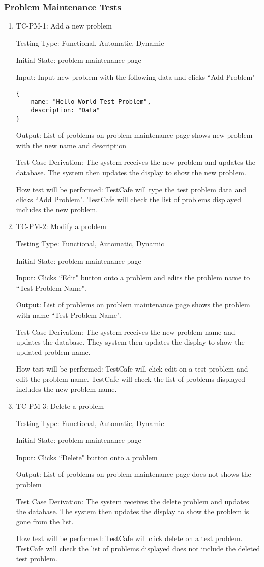 \documentclass[12pt, titlepage]{article}
\begin{document}
\subsubsection{Problem Maintenance Tests}
\begin{enumerate}
\item{TC-PM-1: Add a new problem}

Testing Type: Functional, Automatic, Dynamic
					
Initial State: problem maintenance page
					
Input: Input new problem with the following data and clicks ``Add Problem" 
\begin{verbatim}
{
    name: "Hello World Test Problem",
    description: "Data"
}
\end{verbatim}
					
Output: List of problems on problem maintenance page shows new problem with the new name and description

Test Case Derivation: The system receives the new problem and updates the database. The system then updates the display to show the new problem.
					
How test will be performed: TestCafe will type the test problem data and clicks ``Add Problem". TestCafe will check the list of problems displayed includes the new problem.

\item{TC-PM-2: Modify a problem}

Testing Type: Functional, Automatic, Dynamic
					
Initial State: problem maintenance page
					
Input: Clicks ``Edit" button onto a problem and edits the problem name to ``Test Problem Name".
					
Output: List of problems on problem maintenance page shows the problem with name ``Test Problem Name".

Test Case Derivation: The system receives the new problem name and updates the database. They system then updates the display to show the updated problem name.
					
How test will be performed: TestCafe will click edit on a test problem and edit the problem name. TestCafe will check the list of problems displayed includes the new problem name.

\item{TC-PM-3: Delete a problem}

Testing Type: Functional, Automatic, Dynamic
					
Initial State: problem maintenance page
					
Input: Clicks ``Delete" button onto a problem
					
Output: List of problems on problem maintenance page does not shows the problem

Test Case Derivation: The system receives the delete problem and updates the database. The system then updates the display to show the problem is gone from the list.
					
How test will be performed: TestCafe will click delete on a test problem. TestCafe will check the list of problems displayed does not include the deleted test problem.
\end{enumerate}
\end{document}
